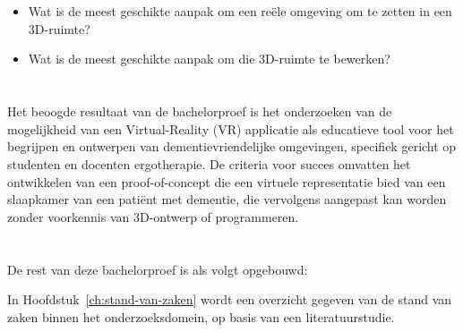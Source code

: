 \section{}%
\label{sec:deelvragen}


\begin{itemize}
\item Wat is de meest geschikte aanpak om een reële omgeving om te zetten in een 3D-ruimte?
\item Wat is de meest geschikte aanpak om die 3D-ruimte te bewerken?
\end{itemize}




\section{}%
\label{sec:onderzoeksdoelstelling}


Het beoogde resultaat van de bachelorproef is het onderzoeken van de mogelijkheid van een Virtual-Reality (VR) applicatie als educatieve tool voor het begrijpen en ontwerpen van dementievriendelijke omgevingen, specifiek gericht op studenten en docenten ergotherapie.
De criteria voor succes omvatten het ontwikkelen van een proof-of-concept die een virtuele representatie bied van een slaapkamer van een patiënt met dementie, die vervolgens aangepast kan worden zonder voorkennis van 3D-ontwerp of programmeren.


\section{}%
\label{sec:opzet-bachelorproef}


De rest van deze bachelorproef is als volgt opgebouwd:

In Hoofdstuk~\ref{ch:stand-van-zaken} wordt een overzicht gegeven van de stand van zaken binnen het onderzoeksdomein, op basis van een literatuurstudie.

